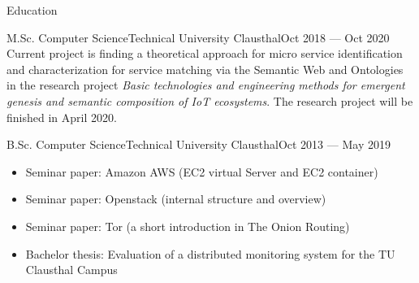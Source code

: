 \documentclass[]{mcdowellcv}
\begin{document}
\begin{cvsection}{Education}
\begin{cvsubsection}{M.Sc. Computer Science}{Technical University Clausthal}{Oct 2018 --- Oct 2020}
Current project is finding a theoretical approach for micro service identification and characterization for service matching via the Semantic Web and Ontologies in the research project \textit{Basic technologies and engineering methods for emergent genesis and semantic composition of IoT ecosystems}. The research project will be finished in April 2020.
\end{cvsubsection}
\begin{cvsubsection}{B.Sc. Computer Science}{Technical University Clausthal}{Oct 2013 --- May 2019}
\begin{itemize}
	\item Seminar paper: Amazon AWS (EC2 virtual Server and EC2 container) 
	\item Seminar paper: Openstack (internal structure and overview) 
	\item Seminar paper: Tor (a short introduction in The Onion Routing) 
	\item Bachelor thesis: Evaluation of a distributed monitoring system for the TU Clausthal Campus 
\end{itemize}
\end{cvsubsection}

\end{cvsection}
\end{document}
